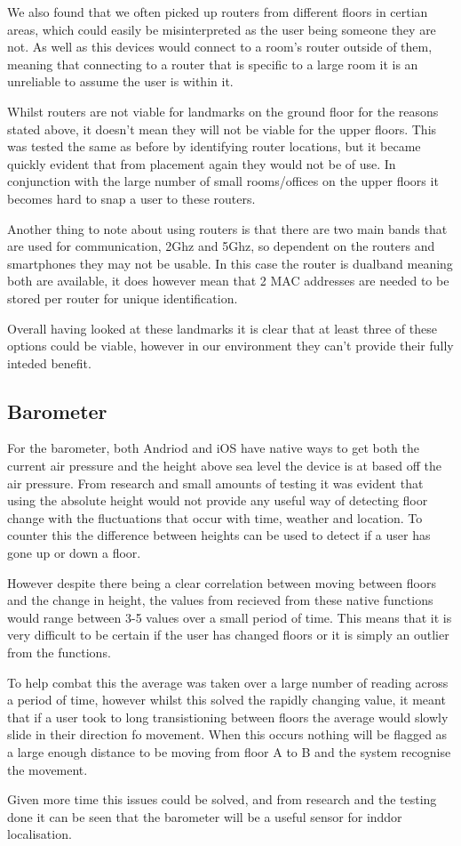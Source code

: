 \documentclass[main.tex]{subfiles}
\begin{document}
We also found that we often picked up routers from different floors in certian areas, which could easily be misinterpreted as the user being someone they are not. As well as this devices would connect to a room's router outside of them, meaning that connecting to a router that is specific to a large room it is an unreliable to assume the user is within it.

Whilst routers are not viable for landmarks on the ground floor for the reasons stated above, it doesn't mean they will not be viable for the upper floors. This was tested the same as before by identifying router locations, but it became quickly evident that from placement again they would not be of use. In conjunction with the large number of small rooms/offices on the upper floors it becomes hard to snap a user to these routers.

Another thing to note about using routers is that there are two main bands that are used for communication, 2Ghz and 5Ghz, so dependent on the routers and smartphones they may not be usable. In this case the router is dualband meaning both are available, it does however mean that 2 MAC addresses are needed to be stored per router for unique identification.

Overall having looked at these landmarks it is clear that at least three of these options could be viable, however in our environment they can't provide their fully inteded benefit.

\subsection{Barometer}

For the barometer, both Andriod and iOS have native ways to get both the current air pressure and the height above sea level the device is at based off the air pressure. From research and small amounts of testing it was evident that using the absolute height would not provide any useful way of detecting floor change with the fluctuations that occur with time, weather and location. To counter this the difference between heights can be used to detect if a user has gone up or down a floor. 

However despite there being a clear correlation between moving between floors and the change in height, the values from recieved from these native functions would range between 3-5 values over a small period of time. This means that it is very difficult to be certain if the user has changed floors or it is simply an outlier from the functions. 

To help combat this the average was taken over a large number of reading across a period of time, however whilst this solved the rapidly changing value, it meant that if a user took to long transistioning between floors the average would slowly slide in their direction fo movement. When this occurs nothing will be flagged as a large enough distance to be moving from floor A to B and the system recognise the movement. 

Given more time this issues could be solved, and from research and the testing done it can be seen that the barometer will be a useful sensor for inddor localisation.
\end{document}
